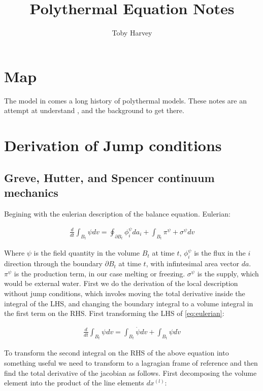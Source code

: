 \documentclass[a4paper,12pt]{article}
\begin{document}
\title{Polythermal Equation Notes}
\author{Toby Harvey}
\maketitle
\vspace{-1cm}

\section{Map}

The model in \cite{schoof_2016} comes a long history of polythermal models. These notes are an attempt at understand \cite{schoof_2016}, and the background to get there. 

\section{Derivation of Jump conditions}

\subsection{Greve, Hutter, and Spencer continuum mechanics}

Begining with the eulerian description of the balance equation. Eulerian:

\begin{align}
\frac{d}{dt} \int_{B_t} \psi dv = \oint_{\partial B_t} \phi_i^\psi da_i + \int_{B_t} \pi^\psi + \sigma^\psi dv \label{eq:eulerian}
\end{align}

Where $\psi$ is the field quantity in the volume $B_t$ at time $t$, $\phi_i^\psi$ is the flux in the $i$ direction through the boundary $\partial B_t$ at time $t$, with infintesimal area vector $da$. $\pi^\psi$ is the production term, in our case melting or freezing. $\sigma^\psi$ is the supply, which would be external water. First we do the derivation of the local description without jump conditions, which involes moving the total derivative inside the integral of the LHS, and changing the boundary integral to a volume integral in the first term on the RHS. First transforming the LHS of \eqref{eq:eulerian}:

\begin{align}
\frac{d}{dt} \int_{B_t} \psi dv = \int_{B_t} \dot{\psi} dv + \int_{B_t} \psi d\dot{v} \label{eq:balance_lhs}
\end{align}

To transform the second integral on the RHS of the above equation into something useful we need to transform to a lagragian frame of reference and then find the total derivative of the jacobian as follows. First decomposing the volume element into the product of the line elements $dx^{(l)}$:
\end{document}
